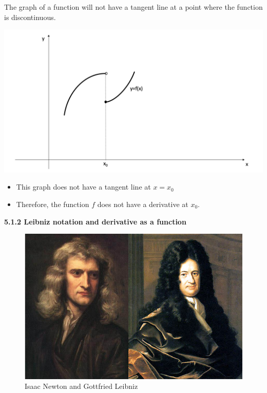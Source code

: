 \documentclass[]{book}
\providecommand{\tightlist}{%
  \setlength{\itemsep}{0pt}\setlength{\parskip}{0pt}}
\begin{document}
\newpage

The graph of a function will not have a tangent line at a point where the function is discontinuous.

\begin{center}\includegraphics[width=1\linewidth]{figure/5Derivatives-5} \end{center}

\begin{itemize}
\tightlist
\item
  This graph does not have a tangent line at \(x=x_{0}\)
\item
  Therefore, the function \(f\) does not have a derivative at \(x_{0}\).
\end{itemize}

\newpage

\textbf{5.1.2 Leibniz notation and derivative as a function}

\begin{figure}

{\centering \includegraphics[width=1\linewidth]{figure/5Derivatives-13} 

}

\caption{Isaac Newton and Gottfried Leibniz}\label{fig:unnamed-chunk-15}
\end{figure}
\end{document}
